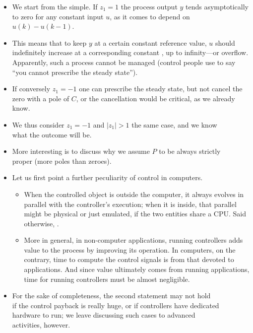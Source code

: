 \begin{frame}
\framesubtitleTC{}
\myPause
 \begin{itemize}[<+-| alert@+>]
 \item We start from the simple. If $z_1=1$ the process output $y$ tends asymptotically to zero
       for any constant input $u$, as it comes to depend on $u(k)-u(k-1)$.
 \item This means that to keep $y$ at a certain constant reference value, $u$ should indefinitely
       increase at a corresponding constant , up to infinity---or overflow.
       Apparently, such a process cannot be managed (control people use to say ``you cannot prescribe
       the steady state'').
 \item If conversely $z_1=-1$ one can prescribe the steady state, but not cancel the zero with a
       pole of $C$, or the cancellation would be critical, as we already know.
 \item We thus consider $z_1=-1$ and $|z_1|>1$ the same case, and we know\\
       what the outcome will be.
 \item More interesting is to discuss why we assume $P$ to be always strictly\\
       proper (more poles than zeroes). 
 \end{itemize}
\end{frame}

\begin{frame}
\myPause
 \begin{itemize}[<+-| alert@+>]
 \item Let us first point a further peculiarity of control in computers.
       \begin{itemize}[<+-| alert@+>]
       \item When the controlled object is outside the computer, it always evolves in 
             parallel with the controller's execution; when it is inside, that parallel might be physical
             or just emulated, if the two entities share a CPU. Said otherwise, .
       \item More in general, in non-computer applications, running controllers adds value to the process
             by improving its operation. In computers, on the contrary, time to compute the control signals
             is  from that devoted to applications. And since value ultimately comes from
             running applications, time for running controllers must be almost negligible.
       \end{itemize}
 \item For the sake of completeness, the second statement may not hold\\
       if the control payback is really huge, or if controllers have dedicated\\
       hardware to run; we leave discussing such cases to advanced\\
       activities, however.
 \end{itemize}
\end{frame}

